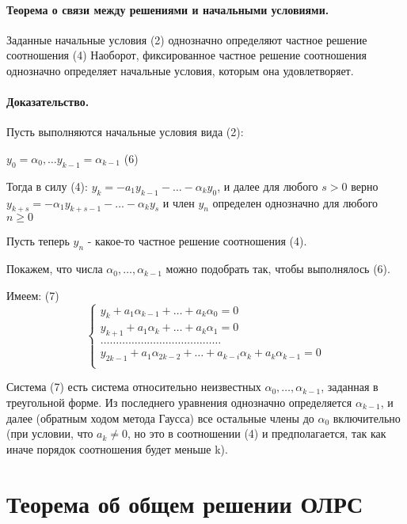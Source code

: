 \documentclass{report}
\begin{document}
\paragraph*{Теорема о связи между решениями и начальными условиями.}
Заданные начальные условия (2) однозначно
определяют частное решение соотношения (4)
Наоборот, фиксированное частное решение соотношения однозначно определяет
начальные условия, которым она удовлетворяет.

\paragraph*{Доказательство.}
Пусть выполняются начальные условия вида (2):

$y_0=\alpha_0,\ldots y_{k-1}=\alpha_{k-1}$ (6)

Тогда в силу (4):
$y_{k}=-a_1y_{k-1} - \ldots - \alpha_{k}y_{0}$, и далее для любого $s > 0$
верно  $y_{k+s} = -\alpha_1y_{k+s-1} - \ldots - \alpha_{k}y_{s}$ и член
$y_{n}$ определен однозначно для любого $n\ge 0$

Пусть теперь $y_{n}$ - какое-то частное решение соотношения (4).

Покажем, что числа $\alpha_0,\ldots,\alpha_{k-1}$ можно подобрать так, чтобы
выполнялось (6).

Имеем: (7)
\[
\begin{cases}
	y_{k} + a_1\alpha_{k-1} + \ldots + a_{k}\alpha_0 = 0\\
	y_{k+1} + a_1\alpha_{k} + \ldots + a_{k}\alpha_1 = 0\\
	\ldots\ldots\ldots\ldots\ldots\ldots\ldots\ldots\ldots\ldots\ldots\ldots\ldots\\
	y_{2k-1} + a_1\alpha_{2k-2} + \ldots + a_{k-i}\alpha_{k} + a_{k}\alpha_{k-1} = 0\\
\end{cases}
\]

Система (7) есть система относительно неизвестных $\alpha_0,\ldots,\alpha_{k-1}$,
заданная в треугольной форме. Из последнего уравнения однозначно определяется
$\alpha_{k-1}$, и далее (обратным ходом метода Гаусса) все остальные члены до $\alpha_0$
включительно (при условии, что $a_{k} \neq 0$, но это в соотношении (4) и предполагается,
так как иначе порядок соотношения будет меньше k).

\newpage

\section{Теорема об общем решении ОЛРС}
\end{document}
